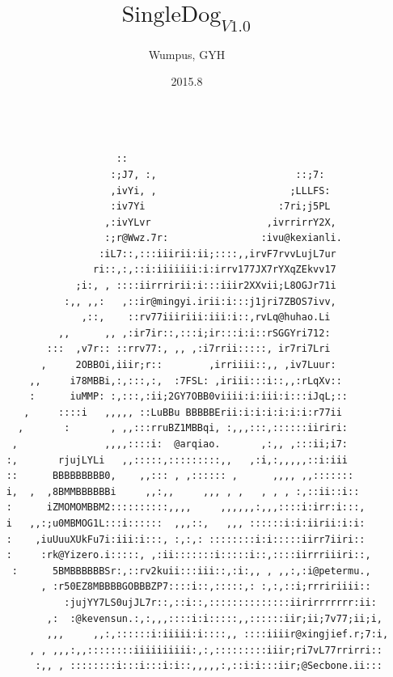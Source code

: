 \documentclass{article}
\title{$\text{SingleDog}_{V1.0}$}
\author{Wumpus, GYH}
\date{2015.8}
\begin{document}


\begin{titlepage}

\maketitle
\setcounter{page}{0}
\thispagestyle{empty}

\begin{verbatim}

                       ::
                      :;J7, :,                        ::;7:
                      ,ivYi, ,                       ;LLLFS:
                      :iv7Yi                       :7ri;j5PL
                     ,:ivYLvr                    ,ivrrirrY2X,
                     :;r@Wwz.7r:                :ivu@kexianli.
                    :iL7::,:::iiirii:ii;::::,,irvF7rvvLujL7ur
                   ri::,:,::i:iiiiiii:i:irrv177JX7rYXqZEkvv17
                ;i:, , ::::iirrririi:i:::iiir2XXvii;L8OGJr71i
              :,, ,,:   ,::ir@mingyi.irii:i:::j1jri7ZBOS7ivv,
                 ,::,    ::rv77iiiriii:iii:i::,rvLq@huhao.Li
             ,,      ,, ,:ir7ir::,:::i;ir:::i:i::rSGGYri712:
           :::  ,v7r:: ::rrv77:, ,, ,:i7rrii:::::, ir7ri7Lri
          ,     2OBBOi,iiir;r::        ,irriiii::,, ,iv7Luur:
        ,,     i78MBBi,:,:::,:,  :7FSL: ,iriii:::i::,,:rLqXv::
        :      iuMMP: :,:::,:ii;2GY7OBB0viiii:i:iii:i:::iJqL;::
       ,     ::::i   ,,,,, ::LuBBu BBBBBErii:i:i:i:i:i:i:r77ii
      ,       :       , ,,:::rruBZ1MBBqi, :,,,:::,::::::iiriri:
     ,               ,,,,::::i:  @arqiao.       ,:,, ,:::ii;i7:
    :,       rjujLYLi   ,,:::::,:::::::::,,   ,:i,:,,,,,::i:iii
    ::      BBBBBBBBB0,    ,,::: , ,:::::: ,      ,,,, ,,:::::::
    i,  ,  ,8BMMBBBBBBi     ,,:,,     ,,, , ,   , , , :,::ii::i::
    :      iZMOMOMBBM2::::::::::,,,,     ,,,,,,:,,,::::i:irr:i:::,
    i   ,,:;u0MBMOG1L:::i::::::  ,,,::,   ,,, ::::::i:i:iirii:i:i:
    :    ,iuUuuXUkFu7i:iii:i:::, :,:,: ::::::::i:i:::::iirr7iiri::
    :     :rk@Yizero.i:::::, ,:ii:::::::i:::::i::,::::iirrriiiri::,
     :      5BMBBBBBBSr:,::rv2kuii:::iii::,:i:,, , ,,:,:i@petermu.,
          , :r50EZ8MBBBBGOBBBZP7::::i::,:::::,: :,:,::i;rrririiii::
              :jujYY7LS0ujJL7r::,::i::,::::::::::::::iirirrrrrrr:ii:
           ,:  :@kevensun.:,:,,,::::i:i:::::,,::::::iir;ii;7v77;ii;i,
           ,,,     ,,:,::::::i:iiiii:i::::,, ::::iiiir@xingjief.r;7:i,
        , , ,,,:,,::::::::iiiiiiiiii:,:,:::::::::iiir;ri7vL77rrirri::
         :,, , ::::::::i:::i:::i:i::,,,,,:,::i:i:::iir;@Secbone.ii:::
\end{verbatim}
\end{titlepage}
\newpage
\end{document}
